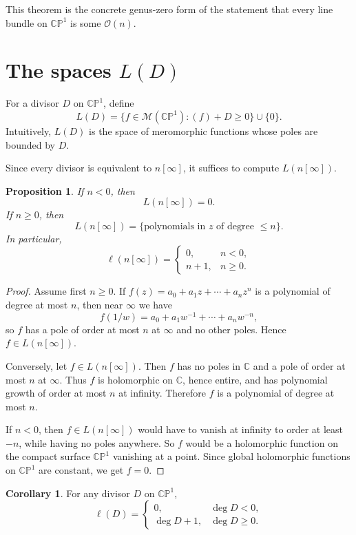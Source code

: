 \documentclass[11pt]{article}
\newcommand{\C}{\mathbb{C}}
\newcommand{\CP}{\mathbb{CP}}
\newcommand{\OO}{\mathcal{O}}
\newcommand{\MM}{\mathcal{M}}
\newcommand{\degd}{\operatorname{deg}}
\newcommand{\ellD}{\ell}
\newcommand{\CPone}{\CP^1}
\theoremstyle{definition}
\newtheorem{corollary}[definition]{Corollary}
\theoremstyle{plain}
\newtheorem{proposition}[definition]{Proposition}
\begin{document}
This theorem is the concrete genus-zero form of the statement that every line bundle on $\CPone$ is some $\OO(n)$.

\section{The spaces \texorpdfstring{$L(D)$}{L(D)}}
For a divisor $D$ on $\CPone$, define
\[
L(D)=\{f\in \MM(\CPone):(f)+D\ge 0\}\cup\{0\}.
\]
Intuitively, $L(D)$ is the space of meromorphic functions whose poles are bounded by $D$.

Since every divisor is equivalent to $n[\infty]$, it suffices to compute $L(n[\infty])$.

\begin{proposition}
If $n<0$, then
\[
L(n[\infty])=0.
\]
If $n\ge 0$, then
\[
L(n[\infty])=\{\text{polynomials in }z\text{ of degree }\le n\}.
\]
In particular,
\[
\ellD(n[\infty])=
\begin{cases}
0,& n<0,\\
 n+1,& n\ge 0.
\end{cases}
\]
\end{proposition}

\begin{proof}
Assume first $n\ge 0$. If $f(z)=a_0+a_1z+\cdots +a_n z^n$ is a polynomial of degree at most $n$, then near $\infty$ we have
\[
f(1/w)=a_0+a_1w^{-1}+\cdots+a_n w^{-n},
\]
so $f$ has a pole of order at most $n$ at $\infty$ and no other poles. Hence $f\in L(n[\infty])$.

Conversely, let $f\in L(n[\infty])$. Then $f$ has no poles in $\C$ and a pole of order at most $n$ at $\infty$. Thus $f$ is holomorphic on $\C$, hence entire, and has polynomial growth of order at most $n$ at infinity. Therefore $f$ is a polynomial of degree at most $n$.

If $n<0$, then $f\in L(n[\infty])$ would have to vanish at infinity to order at least $-n$, while having no poles anywhere. So $f$ would be a holomorphic function on the compact surface $\CPone$ vanishing at a point. Since global holomorphic functions on $\CPone$ are constant, we get $f=0$.
\end{proof}

\begin{corollary}
For any divisor $D$ on $\CPone$,
\[
\ellD(D)=
\begin{cases}
0,& \degd D<0,\\
\degd D+1,& \degd D\ge 0.
\end{cases}
\]
\end{corollary}
\end{document}
